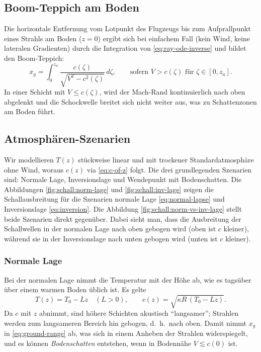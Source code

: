 \subsection{Boom-Teppich am Boden}
Die horizontale Entfernung vom Lotpunkt des Flugzeugs bis zum
Aufprallpunkt eines Strahls am Boden ($z=0$) ergibt sich bei einfachem
Fall (kein Wind, keine lateralen Gradienten) durch die
Integration von \eqref{eq:ray-ode-inverse} und bildet den Boom-Teppich:
\begin{equation}
    \quad
    x_g = \int_{0}^{z_a} \frac{c(\zeta)}{\sqrt{V^2 - c^2(\zeta)}} \,d\zeta,
    \qquad \text{sofern } V>c(\zeta) \text{ für } \zeta\in[0,z_a].
    \quad
    \label{eq:ground-range}
\end{equation}
In einer Schicht mit $V\le c(\zeta)$, wird der Mach-Rand kontinuierlich
nach oben abgelenkt und die Schockwelle breitet sich nicht weiter aus,
was zu Schattenzonen am Boden führt.

\subsection{Atmosphären-Szenarien}\label{schall:subsection:atmos-scenarios}
Wir modellieren $T(z)$ stückweise linear und mit trockener
Standardatmosphäre ohne Wind, woraus $c(z)$ via \eqref{eq:c-of-z} folgt.
Die drei grundlegenden Szenarien sind: Normale Lage, Inversionslage und
Wendepunkt mit Bodenschatten.
Die Abbildungen \ref{fig:schall:norm-lage} und \ref{fig:schall:inv-lage}
zeigen die Schallausbreitung für die Szenarien normale Lage
\eqref{eq:normal-lapse} und Inversionslage \eqref{eq:inversion}.
Die Abbildung \ref{fig:schall:norm-vs-inv-lage} stellt beide Szenarien
direkt gegenüber.
Dabei sieht man, dass die Ausbreitung der Schallwellen
in der normalen Lage nach oben gebogen wird (oben ist $c$ kleiner),
während sie in der Inversionslage nach unten gebogen wird (unten ist $c$ kleiner).

\subsubsection{Normale Lage}
Bei der normalen Lage nimmt die Temperatur mit der Höhe ab,
wie es tagsüber über einem warmen Boden üblich ist.
Es gelte
\begin{equation}
    T(z) = T_0 - Lz \quad (L>0),
    \qquad
    c(z) = \sqrt{\kappa R\,(T_0 - Lz)} .
    \label{eq:normal-lapse}
\end{equation}
Da $c$ mit $z$ abnimmt, sind höhere Schichten akustisch
``langsamer''; Strahlen werden zum langsameren Bereich hin
gebogen, d.~h.~nach oben.
Damit nimmt $x_g$ in \eqref{eq:ground-range} ab, was sich in einem Anheben
der Strahlen widerspiegelt, und es können \emph{Bodenschatten}
entstehen, wenn in Bodennähe $V\lesssim c(0)$ ist.

